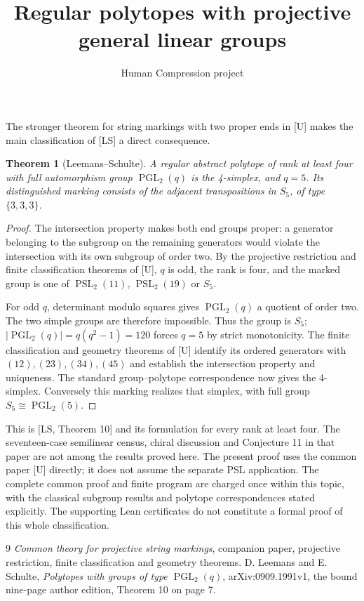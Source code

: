 \documentclass[11pt,a4paper]{article}
\title{Regular polytopes with projective general linear groups}
\author{Human Compression project}
\date{}
\newtheorem{theorem}{Theorem}
\begin{document}
\maketitle

The stronger theorem for string markings with two proper ends in [U]
makes the main classification of [LS] a direct consequence.

\begin{theorem}[Leemans--Schulte]
A regular abstract polytope of rank at least four with full
automorphism group $\operatorname{PGL}_2(q)$ is the 4-simplex, and
$q=5$. Its distinguished marking consists of the adjacent transpositions
in $S_5$, of type $\{3,3,3\}$.
\end{theorem}

\begin{proof}
The intersection property makes both end groups proper: a generator
belonging to the subgroup on the remaining generators would violate
the intersection with its own subgroup of order two. By the
projective restriction and finite classification theorems of [U],
$q$ is odd, the rank is four, and the marked group is one of
$\operatorname{PSL}_2(11)$, $\operatorname{PSL}_2(19)$ or $S_5$.

For odd $q$, determinant modulo squares gives
$\operatorname{PGL}_2(q)$ a quotient of order two. The two simple
groups are therefore impossible. Thus the group is $S_5$;
$|\operatorname{PGL}_2(q)|=q(q^2-1)=120$ forces $q=5$ by strict
monotonicity. The finite classification and geometry theorems of [U]
identify its ordered generators with $(12),(23),(34),(45)$ and
establish the intersection property and uniqueness. The standard
group--polytope correspondence now gives the 4-simplex. Conversely
this marking realizes that simplex, with full group
$S_5\cong\operatorname{PGL}_2(5)$.
\end{proof}

This is [LS, Theorem 10] and its formulation for every rank
at least four. The seventeen-case semilinear census, chiral discussion
and Conjecture 11 in that paper are not among the results proved here.
The present proof uses the common paper [U] directly; it does not
assume the separate PSL application. The complete common proof and
finite program are charged once within this topic, with the
classical subgroup results and polytope correspondences stated explicitly.
The supporting Lean certificates do not constitute a formal proof of
this whole classification.

\begin{thebibliography}{9}
 \emph{Common theory for projective string markings},
companion paper, projective restriction, finite classification and
geometry theorems.
 D. Leemans and E. Schulte,
\emph{Polytopes with groups of type $\operatorname{PGL}_2(q)$},
arXiv:0909.1991v1, the bound nine-page author edition,
Theorem 10 on page 7.
\end{thebibliography}
\end{document}
